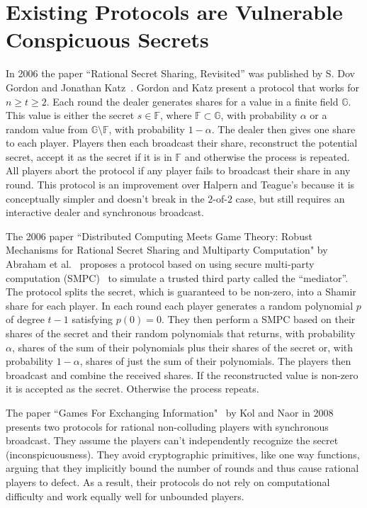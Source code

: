 \documentclass[12pt]{dalcsthesis}
\begin{document}
\chapter{Existing Protocols are Vulnerable Conspicuous Secrets}
\label{chapter:RelatedWork}

In 2006 the paper ``Rational Secret Sharing, Revisited'' was published by S. Dov Gordon and Jonathan Katz~\cite{gordon06}. Gordon and Katz present a protocol that works for $n \geq t \geq 2$. Each round the dealer generates shares for a value in a finite field $\mathbb{G}$. This value is either the secret $s \in \mathbb{F}$, where $\mathbb{F} \subset \mathbb{G}$, with probability $\alpha$ or a random value from $\mathbb{G} \setminus \mathbb{F}$, with probability $1-\alpha$. The dealer then gives one share to each player. Players then each broadcast their share, reconstruct the potential secret, accept it as the secret if it is in $\mathbb{F}$ and otherwise the process is repeated. All players abort the protocol if any player fails to broadcast their share in any round. This protocol is an improvement over Halpern and Teague's because it is conceptually simpler and doesn't break in the $2$-of-$2$ case, but still requires an interactive dealer and synchronous broadcast.

The 2006 paper ``Distributed Computing Meets Game Theory: Robust Mechanisms for Rational Secret Sharing and Multiparty Computation" by Abraham et al.~\cite{abraham06} proposes a protocol based on using secure multi-party computation (SMPC)~\cite{Yao82} to simulate a trusted third party called the ``mediator''. The protocol splits the secret, which is guaranteed to be non-zero, into a Shamir share for each player. In each round each player generates a random polynomial $p$ of degree $t-1$ satisfying $p(0) = 0$. They then perform a SMPC based on their shares of the secret and their random polynomials that returns, with probability $\alpha$, shares of the sum of their polynomials plus their shares of the secret or, with probability $1-\alpha$, shares of just the sum of their polynomials. The players then broadcast and combine the received shares. If the reconstructed value is non-zero it is accepted as the secret. Otherwise the process repeats.

The paper ``Games For Exchanging Information"~\cite{kol08} by Kol and Naor in 2008 presents two protocols for rational non-colluding players with synchronous broadcast. They assume the players can't independently recognize the secret (inconspicuousness). They avoid cryptographic primitives, like one way functions, arguing that they implicitly bound the number of rounds and thus cause rational players to defect. As a result, their protocols do not rely on computational difficulty and work equally well for unbounded players.
\end{document}
